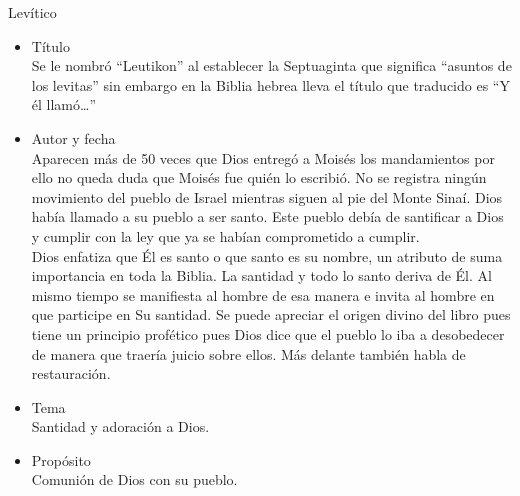 %
%
\begin{section}{Levítico}

\begin{itemize}
	\item Título\\
	Se le nombró ``Leutikon'' al establecer la Septuaginta que significa ``asuntos de los levitas'' sin embargo en la Biblia hebrea lleva el título que traducido es ``Y él llamó\ldots''
	\item Autor y fecha\\
		Aparecen más de 50 veces que Dios entregó a Moisés los mandamientos por ello no queda duda que Moisés fue quién lo escribió. No se registra ningún movimiento del pueblo de Israel mientras siguen al pie del Monte Sinaí. Dios había llamado a su pueblo a ser santo. Este pueblo debía de santificar a Dios y cumplir con la ley que ya se habían comprometido a cumplir.\\
		Dios enfatiza que Él es santo o que santo es su nombre, un atributo de suma importancia en toda la Biblia. La santidad y todo lo santo deriva de Él. Al mismo tiempo se manifiesta al hombre de esa manera e invita al hombre en que participe en Su santidad. Se puede apreciar el origen divino del libro pues tiene un principio profético pues Dios dice que el pueblo lo iba a desobedecer de manera que traería juicio sobre ellos. Más delante también habla de restauración.
	\item Tema\\
		Santidad y adoración a Dios.
	\item Propósito\\
		Comunión de Dios con su pueblo.


\end{itemize}
\end{section}
